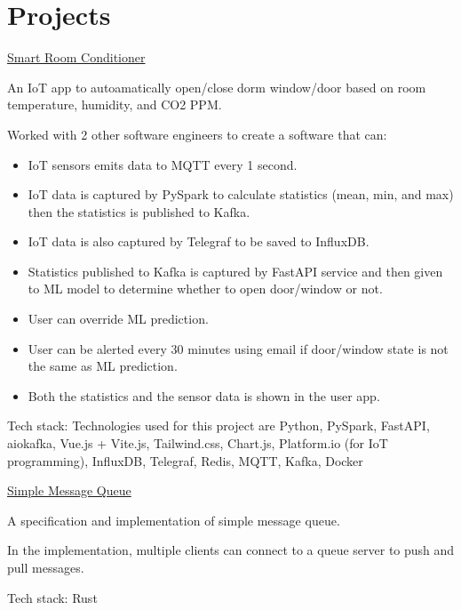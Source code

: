 \documentclass[10pt]{article}
\newcommand{\project}[3]{
    \noindent \href{#2}{#1}

    {#3}
}
\begin{document}
\section{Projects}

\project
    {Smart Room Conditioner}
    {https://github.com/jspmarc/IF4051-Tubes}
    {
        An IoT app to autoamatically open/close dorm window/door based on room temperature,
        humidity, and CO2 PPM.

        Worked with 2 other software engineers to create a software that can:
        \begin{multicols}{2}
            \begin{itemize}
                \item IoT sensors emits data to MQTT every 1 second.
                \item IoT data is captured by PySpark to calculate statistics (mean, min, and max)
                    then the statistics is published to Kafka.
                \item IoT data is also captured by Telegraf to be saved to InfluxDB.
                \item Statistics published to Kafka is captured by FastAPI service and then given
                    to ML model to determine whether to open door/window or not.
                \item User can override ML prediction.
                \item User can be alerted every 30 minutes using email if door/window state is not
                    the same as ML prediction.
                \item Both the statistics and the sensor data is shown in the user app.
            \end{itemize}
        \end{multicols}

        Tech stack: Technologies used for this project are Python, PySpark,
        FastAPI, aiokafka, Vue.js + Vite.js, Tailwind.css, Chart.js,
        Platform.io (for IoT programming), InfluxDB, Telegraf, Redis, MQTT,
        Kafka, Docker
    }

\project
    {Simple Message Queue}
    {https://github.com/jspmarc/simple-message-queue}
    {
        A specification and implementation of simple message queue.

        In the implementation, multiple clients can connect to a queue server to push and pull
        messages.

        Tech stack: Rust
    }
\end{document}
